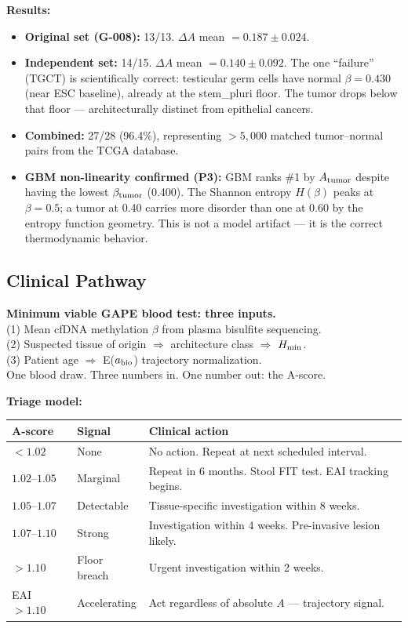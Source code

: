 \documentclass[12pt,a4paper]{article}
\begin{document}
\textbf{Results:}
\begin{itemize}
\item \textbf{Original set (G-008):} 13/13. $\Delta A$ mean $= 0.187 \pm 0.024$.
\item \textbf{Independent set:} 14/15. $\Delta A$ mean $= 0.140 \pm 0.092$.
  The one ``failure'' (TGCT) is scientifically correct: testicular germ cells have
  normal $\beta = 0.430$ (near ESC baseline), already at the stem\_pluri floor.
  The tumor drops below that floor --- architecturally distinct from epithelial cancers.
\item \textbf{Combined:} 27/28 (96.4\%), representing $>5{,}000$ matched
  tumor--normal pairs from the TCGA database.
\item \textbf{GBM non-linearity confirmed (P3):} GBM ranks \#1 by $A_{\rm tumor}$
  despite having the lowest $\beta_{\rm tumor}$ (0.400). The Shannon entropy
  $H(\beta)$ peaks at $\beta = 0.5$; a tumor at 0.40 carries more disorder
  than one at 0.60 by the entropy function geometry.
  This is not a model artifact --- it is the correct thermodynamic behavior.
\end{itemize}

\subsection{Clinical Pathway}
\label{subsec:clinical}

\begin{keybox}
\textbf{Minimum viable GAPE blood test: three inputs.}\\
(1) Mean cfDNA methylation $\beta$ from plasma bisulfite sequencing.\\
(2) Suspected tissue of origin $\Rightarrow$ architecture class $\Rightarrow$ $H_{\rm min}$.\\
(3) Patient age $\Rightarrow$ E($a_{\rm bio}$) trajectory normalization.\\[4pt]
One blood draw. Three numbers in. One number out: the A-score.
\end{keybox}

\noindent \textbf{Triage model:}

\begin{center}
\renewcommand{\arraystretch}{1.25}
\begin{tabular}{llp{5.5cm}}
\toprule
\textbf{A-score} & \textbf{Signal} & \textbf{Clinical action} \\
\midrule
$< 1.02$ & None & No action. Repeat at next scheduled interval. \\
$1.02$--$1.05$ & Marginal & Repeat in 6 months. Stool FIT test. EAI tracking begins. \\
$1.05$--$1.07$ & Detectable & Tissue-specific investigation within 8 weeks. \\
$1.07$--$1.10$ & Strong & Investigation within 4 weeks. Pre-invasive lesion likely. \\
$> 1.10$ & Floor breach & Urgent investigation within 2 weeks. \\
\midrule
EAI $> 1.10$ & Accelerating & Act regardless of absolute $A$ --- trajectory signal. \\
\bottomrule
\end{tabular}
\end{center}
\end{document}
